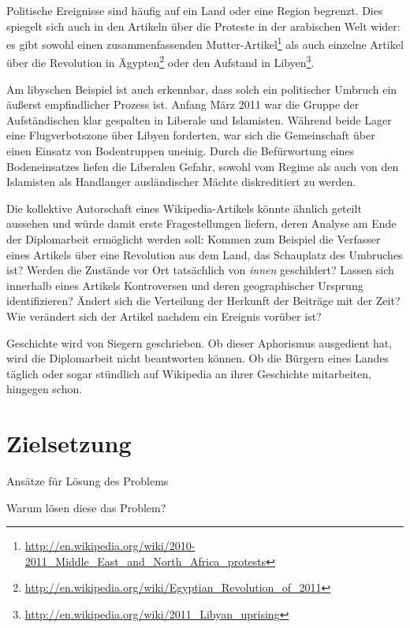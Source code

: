 Politische Ereignisse sind häufig auf ein Land oder eine Region begrenzt.
Dies spiegelt sich auch in den Artikeln über die Proteste in der arabischen Welt wider: es gibt sowohl einen zusammenfassenden \glqq Mutter-Artikel\grqq\footnote{\url{http://en.wikipedia.org/wiki/2010-2011_Middle_East_and_North_Africa_protests}} als auch einzelne Artikel über die Revolution in Ägypten\footnote{\url{http://en.wikipedia.org/wiki/Egyptian_Revolution_of_2011}} oder den Aufstand in Libyen\footnote{\url{http://en.wikipedia.org/wiki/2011_Libyan_uprising}}.

Am libyschen Beispiel ist auch erkennbar, dass solch ein politischer Umbruch ein äußerst empfindlicher Prozess ist.
Anfang März 2011 war die Gruppe der Aufständischen klar gespalten in Liberale und Islamisten.
Während beide Lager eine Flugverbotszone über Libyen forderten, war sich die Gemeinschaft über einen Einsatz von Bodentruppen uneinig.
Durch die Befürwortung eines Bodeneinsatzes liefen die Liberalen Gefahr, sowohl vom Regime als auch von den Islamisten als Handlanger ausländischer Mächte diskreditiert zu werden.\cite{econ18290470}

Die kollektive Autorschaft eines Wikipedia-Artikels könnte ähnlich geteilt aussehen und würde damit erste Fragestellungen liefern, deren Analyse am Ende der Diplomarbeit ermöglicht werden soll:  
Kommen zum Beispiel die Verfasser eines Artikels über eine Revolution aus dem Land, das Schauplatz des Umbruches ist? 
Werden die Zustände vor Ort tatsächlich von \emph{innen} geschildert?
Lassen sich innerhalb eines Artikels Kontroversen und deren geographischer Ursprung identifizieren?
Ändert sich die Verteilung der Herkunft der Beiträge mit der Zeit? 
Wie verändert sich der Artikel nachdem ein Ereignis vorüber ist?


Geschichte wird von Siegern geschrieben. 
Ob dieser Aphorismus ausgedient hat, wird die Diplomarbeit nicht beantworten können.
Ob die Bürgern eines Landes täglich oder sogar stündlich auf Wikipedia an ihrer Geschichte mitarbeiten, hingegen schon.


\section{Zielsetzung}

\begin{todos}
    \item Ansätze für Lösung des Problems
    \item Warum lösen diese das Problem?
\end{todos}

